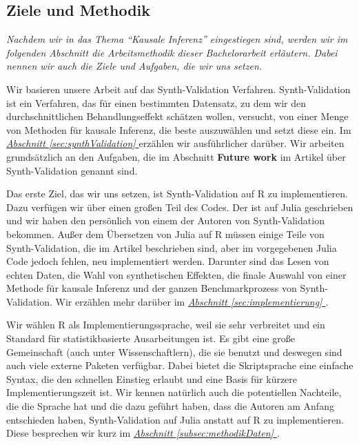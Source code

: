 \documentclass[12pt,a4paper,twoside]{scrartcl}
\numberwithin{equation}{section}
\newcommand{\refsec}[1]{\emph{\hyperref[#1]{Abschnitt \ref*{#1} }}}
\begin{document}
\subsection{Ziele und Methodik}\label{subsec:zieleUndMethodik}

\noindent
\textit{Nachdem wir in das Thema \enquote{Kausale Inferenz} eingestiegen sind, werden wir im folgenden Abschnitt die Arbeitsmethodik dieser Bachelorarbeit erläutern. Dabei nennen wir auch die Ziele und Aufgaben, die wir uns setzen.}\par

Wir basieren unsere Arbeit auf das Synth-Validation Verfahren\cite{schuler2017synth}. Synth-Vali\-dation ist ein Verfahren, das für einen bestimmten Datensatz, zu dem wir den durchschnittlichen Behandlungseffekt schätzen wollen, versucht, von einer Menge von Methoden für kausale Inferenz, die beste auszuwählen und setzt diese ein. Im \refsec{sec:synthValidation} erzählen wir ausführlicher darüber. Wir arbeiten grundsätzlich an den Aufgaben, die im Abschnitt \textbf{Future work} im Artikel über Synth-Validation genannt sind\cite{schuler2017synth}.\par

\noindent
Das erste Ziel, das wir uns setzen, ist Synth-Validation auf R zu implementieren. Dazu verfügen wir über einen großen Teil des Codes. Der ist auf Julia geschrieben und wir haben den persönlich von einem der Autoren von Synth-Validation bekommen. Außer dem Übersetzen von Julia auf R müssen einige Teile von Synth-Validation, die im Artikel beschrieben sind, aber im vorgegebenen Julia Code jedoch fehlen, neu implementiert werden. Darunter sind das Lesen von echten Daten, die Wahl von synthetischen Effekten, die finale Auswahl von einer Methode für kausale Inferenz und der ganzen Benchmarkprozess von Synth-Validation. Wir erzählen mehr darüber im \refsec{sec:implementierung}.\par

\noindent
Wir wählen R als Implementierungssprache, weil sie sehr verbreitet und ein Standard für statistikbasierte Ausarbeitungen ist. Es gibt eine große Gemeinschaft (auch unter Wissenschaftlern), die sie benutzt und deswegen sind auch viele externe Paketen verfügbar. Dabei bietet die Skriptsprache eine einfache Syntax, die den schnellen Einstieg erlaubt und eine Basis für kürzere Implementierungszeit ist. Wir kennen natürlich auch die potentiellen Nachteile, die die Sprache hat und die dazu geführt haben, dass die Autoren am Anfang entschieden haben, Synth-Validation auf Julia anstatt auf R zu implementieren. Diese besprechen wir kurz im \refsec{subsec:methodikDaten}.\par
   
\end{document}
